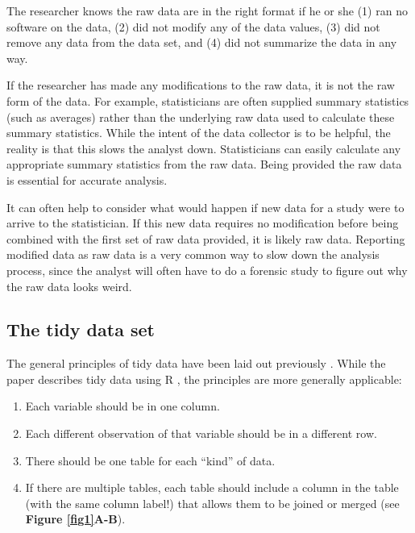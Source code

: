 \documentclass[12pt]{article}
\providecommand{\tightlist}{%
  \setlength{\itemsep}{0pt}\setlength{\parskip}{0pt}}
\begin{document}
The researcher knows the raw data are in the right format if he or she
(1) ran no software on the data, (2) did not modify any of the data
values, (3) did not remove any data from the data set, and (4) did not
summarize the data in any way.

If the researcher has made any modifications to the raw data, it is not
the raw form of the data. For example, statisticians are often supplied
summary statistics (such as averages) rather than the underlying raw
data used to calculate these summary statistics. While the intent of the
data collector is to be helpful, the reality is that this slows the
analyst down. Statisticians can easily calculate any appropriate summary
statistics from the raw data. Being provided the raw data is essential
for accurate analysis.

It can often help to consider what would happen if new data for a study
were to arrive to the statistician. If this new data requires no
modification before being combined with the first set of raw data
provided, it is likely raw data. Reporting modified data as raw data is
a very common way to slow down the analysis process, since the analyst
will often have to do a forensic study to figure out why the raw data
looks weird.

\subsection{The tidy data set}\label{the-tidy-data-set}

The general principles of tidy data have been laid out previously
\citep{_tidy_data}. While the paper describes tidy data using R
\citep{_r}, the principles are more generally applicable:

\begin{enumerate}
\def\labelenumi{\arabic{enumi}.}
\tightlist
\item
  Each variable should be in one column.
\item
  Each different observation of that variable should be in a different
  row.
\item
  There should be one table for each ``kind'' of data.
\item
  If there are multiple tables, each table should include a column in
  the table (with the same column label!) that allows them to be joined
  or merged (see \textbf{Figure \ref{fig1}A-B}).
\end{enumerate}
\end{document}
